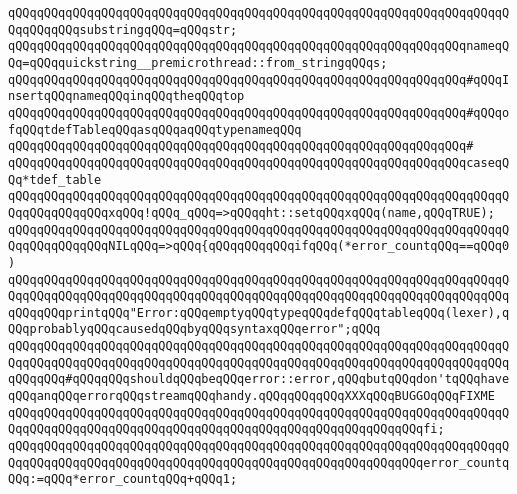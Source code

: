 \verb|qQQqqQQqqQQqqQQqqQQqqQQqqQQqqQQqqQQqqQQqqQQqqQQqqQQqqQQqqQQqqQQqqQQqqQQqqQQqqQQqsubstringqQQq=qQQqstr;|\newline
\newline
\verb|qQQqqQQqqQQqqQQqqQQqqQQqqQQqqQQqqQQqqQQqqQQqqQQqqQQqqQQqqQQqqQQqnameqQQq=qQQqquickstring__premicrothread::from_stringqQQqs;|\newline
\newline
\verb|qQQqqQQqqQQqqQQqqQQqqQQqqQQqqQQqqQQqqQQqqQQqqQQqqQQqqQQqqQQqqQQq#qQQqInsertqQQqnameqQQqinqQQqtheqQQqtop|\newline
\verb|qQQqqQQqqQQqqQQqqQQqqQQqqQQqqQQqqQQqqQQqqQQqqQQqqQQqqQQqqQQqqQQq#qQQqofqQQqtdefTableqQQqasqQQqaqQQqtypenameqQQq|\newline
\verb|qQQqqQQqqQQqqQQqqQQqqQQqqQQqqQQqqQQqqQQqqQQqqQQqqQQqqQQqqQQqqQQq#|\newline
\verb|qQQqqQQqqQQqqQQqqQQqqQQqqQQqqQQqqQQqqQQqqQQqqQQqqQQqqQQqqQQqqQQqcaseqQQq*tdef_table|\newline
\newline
\verb|qQQqqQQqqQQqqQQqqQQqqQQqqQQqqQQqqQQqqQQqqQQqqQQqqQQqqQQqqQQqqQQqqQQqqQQqqQQqqQQqqQQqxqQQq!qQQq_qQQq=>qQQqqht::setqQQqxqQQq(name,qQQqTRUE);|\newline
\newline
\verb|qQQqqQQqqQQqqQQqqQQqqQQqqQQqqQQqqQQqqQQqqQQqqQQqqQQqqQQqqQQqqQQqqQQqqQQqqQQqqQQqqQQqNILqQQq=>qQQq{qQQqqQQqqQQqifqQQq(*error_countqQQq==qQQq0)|\newline
\verb|qQQqqQQqqQQqqQQqqQQqqQQqqQQqqQQqqQQqqQQqqQQqqQQqqQQqqQQqqQQqqQQqqQQqqQQqqQQqqQQqqQQqqQQqqQQqqQQqqQQqqQQqqQQqqQQqqQQqqQQqqQQqqQQqqQQqqQQqqQQqqQQqqQQqprintqQQq"Error:qQQqemptyqQQqtypeqQQqdefqQQqtableqQQq(lexer),qQQqprobablyqQQqcausedqQQqbyqQQqsyntaxqQQqerror";qQQq|\newline
\verb|qQQqqQQqqQQqqQQqqQQqqQQqqQQqqQQqqQQqqQQqqQQqqQQqqQQqqQQqqQQqqQQqqQQqqQQqqQQqqQQqqQQqqQQqqQQqqQQqqQQqqQQqqQQqqQQqqQQqqQQqqQQqqQQqqQQqqQQqqQQqqQQqqQQq#qQQqqQQqshouldqQQqbeqQQqerror::error,qQQqbutqQQqdon'tqQQqhaveqQQqanqQQqerrorqQQqstreamqQQqhandy.qQQqqQQqqQQqXXXqQQqBUGGOqQQqFIXME|\newline
\verb|qQQqqQQqqQQqqQQqqQQqqQQqqQQqqQQqqQQqqQQqqQQqqQQqqQQqqQQqqQQqqQQqqQQqqQQqqQQqqQQqqQQqqQQqqQQqqQQqqQQqqQQqqQQqqQQqqQQqqQQqqQQqqQQqfi;|\newline
\newline
\verb|qQQqqQQqqQQqqQQqqQQqqQQqqQQqqQQqqQQqqQQqqQQqqQQqqQQqqQQqqQQqqQQqqQQqqQQqqQQqqQQqqQQqqQQqqQQqqQQqqQQqqQQqqQQqqQQqqQQqqQQqqQQqqQQqerror_countqQQq:=qQQq*error_countqQQq+qQQq1;|\newline
